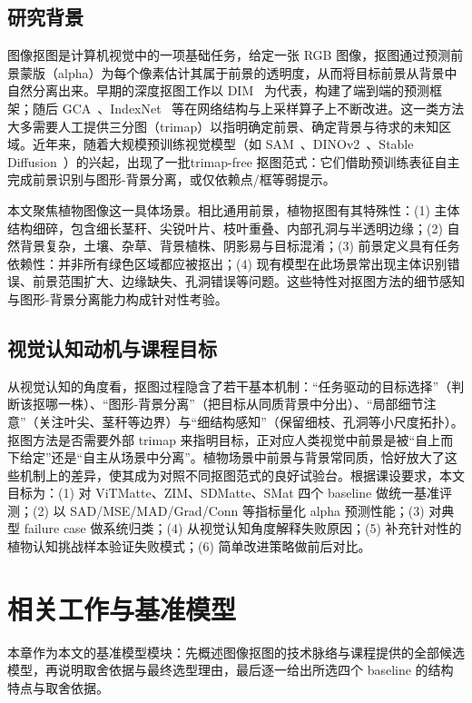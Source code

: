 \documentclass[supercite]{HustGraduPaper}
\begin{document}
	\subsection{研究背景}
	图像抠图是计算机视觉中的一项基础任务，给定一张 RGB 图像，抠图通过预测前景蒙版（alpha）为每个像素估计其属于前景的透明度，从而将目标前景从背景中自然分离出来。早期的深度抠图工作以 DIM~\cite{DIM} 为代表，构建了端到端的预测框架；随后 GCA~\cite{GCA}、IndexNet~\cite{index} 等在网络结构与上采样算子上不断改进。这一类方法大多需要人工提供三分图（trimap）以指明确定前景、确定背景与待求的未知区域。近年来，随着大规模预训练视觉模型（如 SAM~\cite{sam}、DINOv2~\cite{dinov2}、Stable Diffusion~\cite{ldm}）的兴起，出现了一批trimap-free 抠图范式：它们借助预训练表征自主完成前景识别与图形-背景分离，或仅依赖点/框等弱提示。

	本文聚焦植物图像这一具体场景。相比通用前景，植物抠图有其特殊性：(1) 主体结构细碎，包含细长茎秆、尖锐叶片、枝叶重叠、内部孔洞与半透明边缘；(2) 自然背景复杂，土壤、杂草、背景植株、阴影易与目标混淆；(3) 前景定义具有任务依赖性：并非所有绿色区域都应被抠出；(4) 现有模型在此场景常出现主体识别错误、前景范围扩大、边缘缺失、孔洞错误等问题。这些特性对抠图方法的细节感知与图形-背景分离能力构成针对性考验。

	\subsection{视觉认知动机与课程目标}
	从视觉认知的角度看，抠图过程隐含了若干基本机制：“任务驱动的目标选择”（判断该抠哪一株）、“图形-背景分离”（把目标从同质背景中分出）、“局部细节注意”（关注叶尖、茎秆等边界）与“细结构感知”（保留细枝、孔洞等小尺度拓扑）。抠图方法是否需要外部 trimap 来指明目标，正对应人类视觉中前景是被“自上而下给定”还是“自主从场景中分离”。植物场景中前景与背景常同质，恰好放大了这些机制上的差异，使其成为对照不同抠图范式的良好试验台。根据课设要求，本文目标为：(1) 对 ViTMatte、ZIM、SDMatte、SMat 四个 baseline 做统一基准评测；(2) 以 SAD/MSE/MAD/Grad/Conn 等指标量化 alpha 预测性能；(3) 对典型 failure case 做系统归类；(4) 从视觉认知角度解释失败原因；(5) 补充针对性的植物认知挑战样本验证失败模式；(6) 简单改进策略做前后对比。



	\section{相关工作与基准模型}
	本章作为本文的基准模型模块：先概述图像抠图的技术脉络与课程提供的全部候选模型，再说明取舍依据与最终选型理由，最后逐一给出所选四个 baseline 的结构特点与取舍依据。
\end{document}
